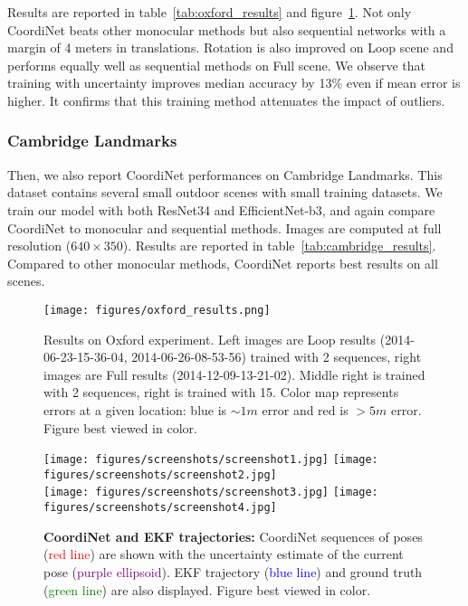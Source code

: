 \documentclass[10pt,twocolumn,letterpaper]{article}
\begin{document}
Results are reported in table~\ref{tab:oxford_results} and figure~\ref{oxford_trajs}. Not only CoordiNet beats other monocular methods but also sequential networks with a margin of 4 meters in translations. Rotation is also improved on Loop scene and performs equally well as sequential methods on Full scene. We observe that training with uncertainty improves median accuracy by 13\% even if mean error is higher. It confirms that this training method attenuates the impact of outliers.

\subsubsection{Cambridge Landmarks}

Then, we also report CoordiNet performances on Cambridge Landmarks. This dataset contains several small outdoor scenes with small training datasets. We train our model with both ResNet34 and EfficientNet-b3, and again compare CoordiNet to monocular and sequential methods. Images are computed at full resolution ($640\times350$). Results are reported in table~\ref{tab:cambridge_results}. Compared to other monocular methods, CoordiNet reports best results on all scenes.

\begin{figure}[!b]
   \texttt{[image: figures/oxford\_results.png]}
   \caption{Results on Oxford experiment. Left images are Loop results (2014-06-23-15-36-04, 2014-06-26-08-53-56) trained with 2 sequences, right images are Full results (2014-12-09-13-21-02). Middle right is trained with 2 sequences, right is trained with 15. Color map represents errors at a given location: blue is $\sim 1m$ error and red is $>5m$ error. Figure best viewed in color.}\label{oxford_trajs}
\end{figure}

\begin{figure*}[!b]
\centering
\texttt{[image: figures/screenshots/screenshot1.jpg]}
\texttt{[image: figures/screenshots/screenshot2.jpg]} \\
\vspace{1mm}
\texttt{[image: figures/screenshots/screenshot3.jpg]}
\texttt{[image: figures/screenshots/screenshot4.jpg]}
   \caption{\textbf{CoordiNet and EKF trajectories:} CoordiNet sequences of poses (\textcolor{red}{red line}) are shown with the uncertainty estimate of the current pose (\textcolor{purple}{purple ellipsoid}). EKF trajectory (\textcolor{blue}{blue line}) and ground truth (\textcolor{green}{green line}) are also displayed. Figure best viewed in color.}\label{screenshots}
\end{figure*}
\end{document}
